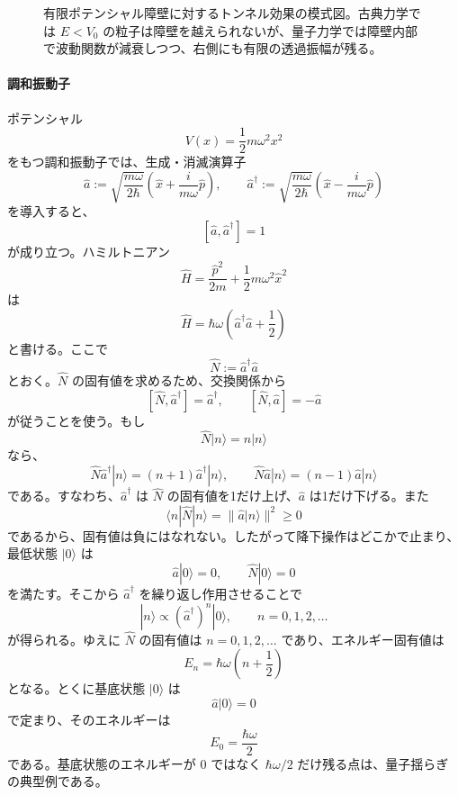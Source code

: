 \begin{figure}[t]
\centering
{}
\caption{有限ポテンシャル障壁に対するトンネル効果の模式図。古典力学では $E<V_0$ の粒子は障壁を越えられないが、量子力学では障壁内部で波動関数が減衰しつつ、右側にも有限の透過振幅が残る。}
\label{fig:tunneling}
\end{figure}
\paragraph{調和振動子}
ポテンシャル
\[
V(x)=\frac{1}{2}m\omega^2 x^2
\]
をもつ調和振動子では、生成・消滅演算子
\[
\hat{a}
:=
\sqrt{\frac{m\omega}{2\hbar}}
\left(
\hat{x}+\frac{i}{m\omega}\hat{p}
\right),
\qquad
\hat{a}^\dagger
:=
\sqrt{\frac{m\omega}{2\hbar}}
\left(
\hat{x}-\frac{i}{m\omega}\hat{p}
\right)
\]
を導入すると、
\[
[\hat{a},\hat{a}^\dagger]=1
\]
が成り立つ。ハミルトニアン
\[
\hat{H}
=
\frac{\hat{p}^2}{2m}+\frac{1}{2}m\omega^2\hat{x}^2
\]
は
\[
\hat{H}=\hbar\omega\left(\hat{a}^\dagger \hat{a}+\frac{1}{2}\right)
\]
と書ける。ここで
\[
\hat{N}:=\hat{a}^\dagger \hat{a}
\]
とおく。$\hat{N}$ の固有値を求めるため、交換関係から
\[
[\hat{N},\hat{a}^\dagger]=\hat{a}^\dagger,
\qquad
[\hat{N},\hat{a}]=-\hat{a}
\]
が従うことを使う。もし
\[
\hat{N}|n\rangle=n|n\rangle
\]
なら、
\[
\hat{N}\hat{a}^\dagger|n\rangle
=
(n+1)\hat{a}^\dagger|n\rangle,
\qquad
\hat{N}\hat{a}|n\rangle
=
(n-1)\hat{a}|n\rangle
\]
である。すなわち、$\hat{a}^\dagger$ は $\hat{N}$ の固有値を1だけ上げ、$\hat{a}$ は1だけ下げる。また
\[
\langle n|\hat{N}|n\rangle
=
\|\hat{a}|n\rangle\|^2
\ge 0
\]
であるから、固有値は負にはなれない。したがって降下操作はどこかで止まり、最低状態 $|0\rangle$ は
\[
\hat{a}|0\rangle=0,
\qquad
\hat{N}|0\rangle=0
\]
を満たす。そこから $\hat{a}^\dagger$ を繰り返し作用させることで
\[
|n\rangle\propto(\hat{a}^\dagger)^n|0\rangle,
\qquad
n=0,1,2,\dots
\]
が得られる。ゆえに $\hat{N}$ の固有値は $n=0,1,2,\dots$ であり、エネルギー固有値は
\[
E_n = \hbar \omega \left(n + \frac{1}{2}\right)
\]
となる。とくに基底状態 $|0\rangle$ は
\[
\hat{a}|0\rangle = 0
\]
で定まり、そのエネルギーは
\[
E_0=\frac{\hbar\omega}{2}
\]
である。基底状態のエネルギーが $0$ ではなく $\hbar\omega/2$ だけ残る点は、量子揺らぎの典型例である。

